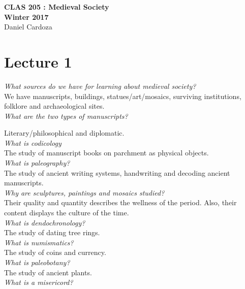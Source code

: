 \documentclass[12pt]{article}
\begin{document}
\begin{center}
	{\Large\bf CLAS 205 : Medieval Society}\\
	\vspace{2mm}
	{\Large\bf Winter 2017}\\
	\vspace{4mm}
	{Daniel Cardoza}\\
\end{center}

\section*{Lecture 1}
\setlength{\parindent}{0pt}

\textit{What sources do we have for learning about medieval society?}\\
We have manuscripts, buildings, statues/art/mosaics, surviving institutions, folklore and archaeological sites.\\

\textit{What are the two types of manuscripts?}

Literary/philosophical and diplomatic.\\

\textit{What is codicology}\\
The study of manuscript books on parchment as physical objects.\\

\textit{What is paleography?}\\
The study of ancient writing systems, handwriting and decoding ancient manuscripts.\\

\textit{Why are sculptures, paintings and mosaics studied?}\\
Their quality and quantity describes the wellness of the period. Also, their content displays the culture of the time.\\

\textit{What is dendochronology?}\\
The study of dating tree rings.\\

\textit{What is numismatics?}\\
The study of coins and currency.\\

\textit{What is paleobotany?}\\
The study of ancient plants.\\

\textit{What is a misericord?}
\end{document}
